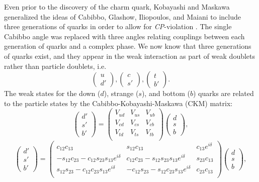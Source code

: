 Even prior to the discovery of the charm quark, Kobayashi and Maskawa generalized the ideas of
Cabibbo, Glashow, Iliopoulos, and Maiani to include three generations of quarks in order to allow for
\textit{CP}-violation \cite{kobayashi1973}. The single
Cabibbo angle was replaced with three angles relating couplings between each generation of quarks and a complex
phase. We now know that three generations of quarks exist, and they appear in the weak interaction as part of weak
doublets rather than particle doublets, i.e.
%
\begin{equation}
  \begin{pmatrix} u \\ d' \end{pmatrix} ,
  \begin{pmatrix} c \\ s' \end{pmatrix} ,
  \begin{pmatrix} t \\ b' \end{pmatrix}.
\end{equation}
%
The weak states for the down ($d$), strange ($s$), and bottom ($b$) quarks are related to the particle states
by the Cabibbo-Kobayashi-Maskawa (CKM) matrix: 
%
\begin{equation}
  \begin{pmatrix} d' \\s' \\ b' \end{pmatrix} =
  \begin{pmatrix} V_{ud} & V_{us} & V_{ub} \\
    V_{cd} & V_{cs} & V_{cb} \\
    V_{td} & V_{ts} & V_{tb} \\
  \end{pmatrix}
  \begin{pmatrix} d \\s \\ b \end{pmatrix} ,
\end{equation}
%
\begin{equation}
  \begin{pmatrix} d' \\s' \\ b' \end{pmatrix} =
  \begin{pmatrix} c_{12}c_{13} & s_{12}c_{13} & c_{13}e^{i\delta} \\
    -s_{12}c_{23}-c_{12}s_{23}s_{13}e^{i\delta} & c_{12}c_{23}-s_{12}s_{23}s_{13}e^{i\delta} & s_{23}c_{13} \\
    s_{12}s_{23}-c_{12}c_{23}s_{13}e^{i\delta} &  -c_{12}s_{23}-s_{12}c_{23}s_{13}e^{i\delta} & c_{23}c_{13} \\
  \end{pmatrix}
  \begin{pmatrix} d \\s \\ b \end{pmatrix},
\end{equation}


